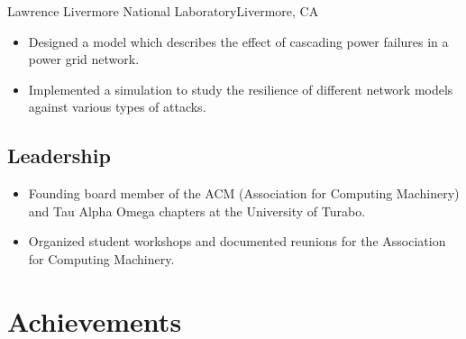 \documentclass[12pt,a4paper,roman]{moderncv}        %
\begin{document}
\vspace{5pt}

{Lawrence Livermore National Laboratory}{Livermore, CA}{}{}

\begin{itemize}
	\item Designed a model which describes the effect of cascading power failures in a power grid network.
	
	\item Implemented a simulation to study the resilience of different network models against various types of attacks.
\end{itemize}

\subsection{Leadership}

\begin{itemize}
	\item Founding board member of the ACM (Association for Computing Machinery) and Tau Alpha Omega chapters at the University of Turabo.
	
	\item Organized student workshops and documented reunions for the Association for Computing Machinery.
\end{itemize}

\section{Achievements}


\vspace{2pt}


\vspace{2pt}


\vspace{2pt}
\end{document}
